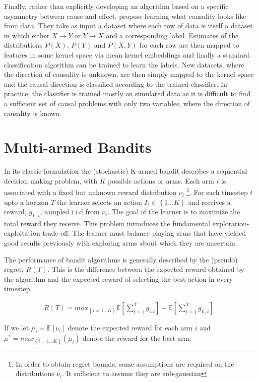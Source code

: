 \documentclass[11pt,a4paper]{article}
\newcommand{\E}[1]{\mathbb E\left[{#1}\right]}
\newcommand{\set}[1]{\left\{#1\right\}}
\newcommand{\eqn}[1]{\begin{align}#1\end{align}}
\begin{document}
Finally, rather than explicitly developing an algorithm based on a specific asymmetry between cause and effect, \cite{LopezPaz2014} propose learning what causality looks like from data. They take as input a dataset where each row of data is itself a dataset in which either $X \rightarrow Y$ or $Y \rightarrow X$ and a corresponding label. Estimates of the distributions $P(X)$, $P(Y)$ and $P(X,Y)$ for each row are then mapped to features in some kernel space via mean kernel embeddings and finally a standard classification algorithm can be trained to learn the labels. New datasets, where the direction of causality is unknown, are then simply mapped to the kernel space and the causal direction is classified according to the trained classifier. In practice, the classifier is trained mostly on simulated data as it is difficult to find a sufficient set of causal problems with only two variables, where the direction of causality is known. 

\section{Multi-armed Bandits}

In its classic formulation \cite{Robbins1952} the (stochastic) K-armed bandit describes a sequential decision making problem, with $K$ possible actions or arms. Each arm $i$ is associated with a fixed but unknown reward distribution $\nu_i$ \footnote{In order to obtain regret bounds, some assumptions are required on the distributions $\nu_i$. It sufficient to assume they are sub-gaussian}.  For each timestep $t$ upto a horizon $T$ the learner selects an action $I_t \in \set{1...K}$ and receives a reward, $g_{I_t,t}$, sampled i.i.d from $\nu_i$. The goal of the learner is to maximize the total reward they receive. This problem introduces the fundamental exploration-exploitation trade-off. The learner must balance playing arms that have yielded good results previously with exploring arms about which they are uncertain. 

The performance of bandit algorithms is generally described by the (pseudo) regret, $R(T)$. This is the difference between the expected reward obtained by the algorithm and the expected reward of selecting the best action in every timestep. 

\eqn {
R(T) = max_{\set{i=1...K}} \E{\sum_{t=1}^T g_{i,t}} - \E{\sum_{t=1}^T g_{I_t,t}}
}

If we let $\mu_i = \E{\nu_i}$ denote the expected reward for each arm $i$ and $\mu^* = max_{\set{i=1...K}}(\mu_i)$ denote the reward for the best arm:
\end{document}
